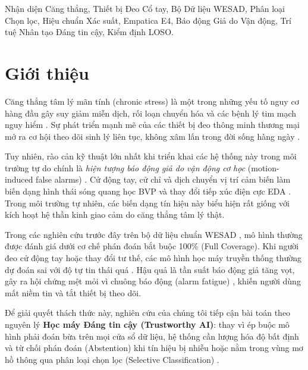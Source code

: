\documentclass[conference]{IEEEtran}
\begin{document}
\begin{IEEEkeywords}
Nhận diện Căng thẳng, Thiết bị Đeo Cổ tay, Bộ Dữ liệu WESAD, Phân loại Chọn lọc, Hiệu chuẩn Xác suất, Empatica E4, Báo động Giả do Vận động, Trí tuệ Nhân tạo Đáng tin cậy, Kiểm định LOSO.
\end{IEEEkeywords}

\section{Giới thiệu}
Căng thẳng tâm lý mãn tính (chronic stress) là một trong những yếu tố nguy cơ hàng đầu gây suy giảm miễn dịch, rối loạn chuyển hóa và các bệnh lý tim mạch nguy hiểm \cite{cohen2007psychological, schneiderman2005stress, can2019stress}. Sự phát triển mạnh mẽ của các thiết bị đeo thông minh thương mại mở ra cơ hội theo dõi sinh lý liên tục, không xâm lấn trong đời sống hàng ngày \cite{gjoreski2016continuous, schmidt2018wesad, sano2015recognizing}.

Tuy nhiên, rào cản kỹ thuật lớn nhất khi triển khai các hệ thống này trong môi trường tự do chính là \textit{hiện tượng báo động giả do vận động cơ học} (motion-induced false alarms) \cite{schumm2008effect, tamura2014wearable, zhang2014troika}. Cử động tay, cử chỉ và dịch chuyển vị trí cảm biến làm biến dạng hình thái sóng quang học BVP và thay đổi tiếp xúc điện cực EDA \cite{boucsein2012electrodermal}. Trong môi trường tự nhiên, các biến dạng tín hiệu này biểu hiện rất giống với kích hoạt hệ thần kinh giao cảm do căng thẳng tâm lý thật.

Trong các nghiên cứu trước đây trên bộ dữ liệu chuẩn WESAD \cite{schmidt2018wesad, siirtola2019continuous, bobade2020stress, dalmeida2021hrv, behinaein2021transformer, castaldo2015acute}, mô hình thường được đánh giá dưới cơ chế phán đoán bắt buộc 100\% (Full Coverage). Khi người đeo cử động tay hoặc thay đổi tư thế, các mô hình học máy truyền thống thường dự đoán sai với độ tự tin thái quá \cite{guo2017calibration}. Hậu quả là tần suất báo động giả tăng vọt, gây ra hội chứng mệt mỏi vì chuông báo động (alarm fatigue) \cite{sendelbach2013alarm}, khiến người dùng mất niềm tin và tắt thiết bị theo dõi.

Để giải quyết thách thức này, nghiên cứu của chúng tôi tiếp cận bài toán theo nguyên lý \textbf{Học máy Đáng tin cậy (Trustworthy AI)}: thay vì ép buộc mô hình phải đoán bừa trên mọi cửa sổ dữ liệu, hệ thống cần lượng hóa độ bất định và từ chối phán đoán (Abstention) khi tín hiệu bị nhiễu hoặc nằm trong vùng mơ hồ thông qua phân loại chọn lọc (Selective Classification) \cite{chow1970optimum, cortes2016learning, geifman2017selective, geifman2019selectivenet, grandvalet2008support, hendrickx2024machine}.
\end{document}
